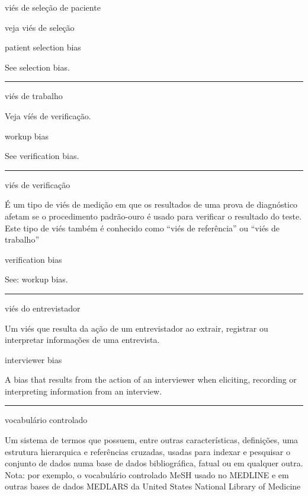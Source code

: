 \documentclass[
  openany]{book}
\begin{document}
viés de seleção de paciente

veja viés de seleção

patient selection bias

See selection bias.

\begin{center}\rule{0.5\linewidth}{0.5pt}\end{center}

viés de trabalho

Veja víés de verificação.

workup bias

See verification bias.

\begin{center}\rule{0.5\linewidth}{0.5pt}\end{center}

viés de verificação

É um tipo de viés de medição em que os resultados de uma prova de diagnóstico afetam se o procedimento padrão-ouro é usado para verificar o resultado do teste. Este tipo de viés também é conhecido como ``viés de referência'' ou ``viés de trabalho''

verification bias

See: workup bias.

\begin{center}\rule{0.5\linewidth}{0.5pt}\end{center}

viés do entrevistador

Um viés que resulta da ação de um entrevistador ao extrair, registrar ou interpretar informações de uma entrevista.

interviewer bias

A bias that results from the action of an interviewer when eliciting, recording or interpreting information from an interview.

\begin{center}\rule{0.5\linewidth}{0.5pt}\end{center}

vocabulário controlado

Um sistema de termos que possuem, entre outras características, definições, uma estrutura hierarquica e referências cruzadas, usadas para indexar e pesquisar o conjunto de dados numa base de dados bibliográfica, fatual ou em qualquer outra. Nota: por exemplo, o vocabulário controlado MeSH usado no MEDLINE e em outras bases de dados MEDLARS da United States National Library of Medicine
\end{document}
